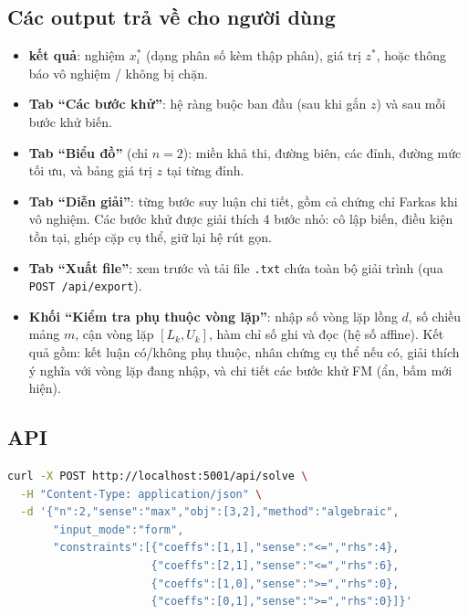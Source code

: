 \documentclass[12pt,a4paper]{article}
\theoremstyle{definition}
\begin{document}
\subsection{Các output trả về cho người dùng}

\begin{itemize}
    \item \textbf{ kết quả}: nghiệm $x_i^\ast$ (dạng phân số kèm thập phân),
          giá trị $z^\ast$, hoặc thông báo vô nghiệm / không bị chặn.
    \item \textbf{Tab ``Các bước khử''}: hệ ràng buộc ban đầu (sau khi gắn $z$)
          và sau mỗi bước khử biến.
    \item \textbf{Tab ``Biểu đồ''} (chỉ $n = 2$): miền khả thi, đường biên, các
          đỉnh, đường mức tối ưu, và bảng giá trị $z$ tại từng đỉnh.
    \item \textbf{Tab ``Diễn giải''}: từng bước suy luận chi tiết, gồm cả chứng chỉ Farkas khi vô nghiệm. Các bước khử được giải thích 4 bước nhỏ: cô lập biến, điều kiện tồn tại, ghép cặp cụ thể, giữ lại hệ rút gọn.
    \item \textbf{Tab ``Xuất file''}: xem trước và tải file \texttt{.txt} chứa
          toàn bộ giải trình (qua \texttt{POST /api/export}).
    \item \textbf{Khối ``Kiểm tra phụ thuộc vòng lặp''}: nhập số vòng lặp lồng
          $d$, số chiều mảng $m$, cận vòng lặp $[L_k, U_k]$, hàm chỉ số ghi và
          đọc (hệ số affine). Kết quả gồm: kết luận có/không phụ thuộc, nhân
          chứng cụ thể nếu có, giải thích ý nghĩa với vòng lặp đang nhập, và
          chi tiết các bước khử FM (ẩn, bấm mới hiện).
\end{itemize}

\subsection{API}

\begin{lstlisting}[language=bash, caption={Gọi POST /api/solve}]
curl -X POST http://localhost:5001/api/solve \
  -H "Content-Type: application/json" \
  -d '{"n":2,"sense":"max","obj":[3,2],"method":"algebraic",
       "input_mode":"form",
       "constraints":[{"coeffs":[1,1],"sense":"<=","rhs":4},
                      {"coeffs":[2,1],"sense":"<=","rhs":6},
                      {"coeffs":[1,0],"sense":">=","rhs":0},
                      {"coeffs":[0,1],"sense":">=","rhs":0}]}'
\end{lstlisting}
\end{document}
